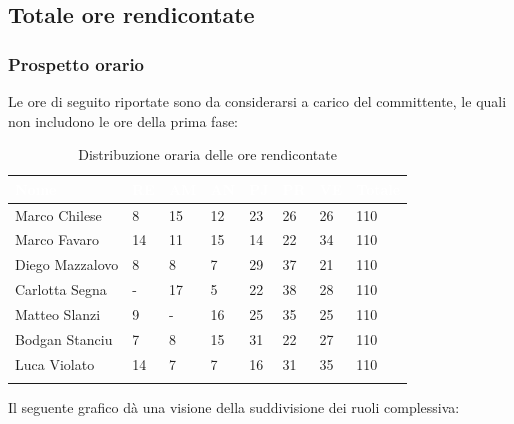 \newpage

\subsection{Totale ore rendicontate}
\label{PTRR}
\subsubsection{Prospetto orario}

Le ore di seguito riportate sono da considerarsi a carico del committente, le quali non includono le ore della prima fase:

\begin{longtable}{|C{.30\textwidth}|C{.06\textwidth}|C{.06\textwidth}|C{.06\textwidth} | C{.06\textwidth}| C{.06\textwidth} | C{.06\textwidth} | C{.10\textwidth} |}
\hline
{}	\textbf{\textcolor{white}{Nome}} & \textbf{\textcolor{white}{RE}} & \textbf{\textcolor{white}{AM}} & \textbf{\textcolor{white}{AN}} & \textbf{\textcolor{white}{PJ}} & \textbf{\textcolor{white}{PR}} & \textbf{\textcolor{white}{VE}} & \textbf{\textcolor{white}{Totale}}\\
\hline 
Marco Chilese & 8 & 15 & 12 & 23 & 26 & 26 & 110\\
\hline
{}Marco Favaro & 14 & 11 & 15 & 14 & 22 & 34 & 110\\
\hline
Diego Mazzalovo & 8 & 8 & 7 & 29 & 37 & 21 & 110\\
\hline
{}Carlotta Segna & - & 17 & 5 & 22 & 38 & 28 & 110\\
\hline
Matteo Slanzi & 9 & - & 16 & 25 & 35 & 25 & 110\\
\hline
{}Bodgan Stanciu & 7 & 8 & 15 & 31 & 22 & 27 & 110\\
\hline
Luca Violato & 14 & 7 & 7 & 16 & 31 & 35 & 110 \\
\hline

\caption{Distribuzione oraria delle ore rendicontate}
\label{Distribuzione oraria delle ore rendicontate}
\end{longtable}

Il seguente grafico dà una visione della suddivisione dei ruoli complessiva:

